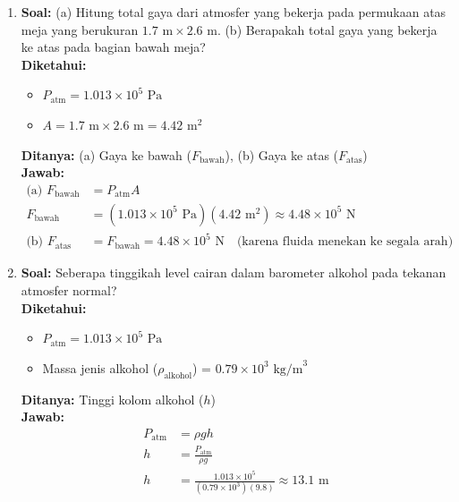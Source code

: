 \documentclass[twocolumn]{article}
\begin{document}
\begin{enumerate}
    \item \textbf{Soal:} (a) Hitung total gaya dari atmosfer yang bekerja pada permukaan atas meja yang berukuran $1.7 \text{ m} \times 2.6 \text{ m}$. (b) Berapakah total gaya yang bekerja ke atas pada bagian bawah meja? \\
    \textbf{Diketahui:}
    \begin{itemize}
        \item $P_{\text{atm}} = 1.013 \times 10^5 \text{ Pa}$
        \item $A = 1.7 \text{ m} \times 2.6 \text{ m} = 4.42 \text{ m}^2$
    \end{itemize}
    \textbf{Ditanya:} (a) Gaya ke bawah ($F_{\text{bawah}}$), (b) Gaya ke atas ($F_{\text{atas}}$) \\
    \textbf{Jawab:}
    \begin{align*}
        \text{(a) } F_{\text{bawah}} &= P_{\text{atm}} A \\
        F_{\text{bawah}} &= (1.013 \times 10^5 \text{ Pa})(4.42 \text{ m}^2) \approx 4.48 \times 10^5 \text{ N} \\
        \text{(b) } F_{\text{atas}} &= F_{\text{bawah}} = 4.48 \times 10^5 \text{ N} \quad \text{(karena fluida menekan ke segala arah)}
    \end{align*}

    \item \textbf{Soal:} Seberapa tinggikah level cairan dalam barometer alkohol pada tekanan atmosfer normal? \\
    \textbf{Diketahui:} 
    \begin{itemize}
        \item $P_{\text{atm}} = 1.013 \times 10^5 \text{ Pa}$
        \item Massa jenis alkohol ($\rho_{\text{alkohol}}$) = $0.79 \times 10^3 \text{ kg/m}^3$
    \end{itemize}
    \textbf{Ditanya:} Tinggi kolom alkohol ($h$) \\
    \textbf{Jawab:}
    \begin{align*}
        P_{\text{atm}} &= \rho g h \\
        h &= \frac{P_{\text{atm}}}{\rho g} \\
        h &= \frac{1.013 \times 10^5}{(0.79 \times 10^3)(9.8)} \approx 13.1 \text{ m}
    \end{align*}


\end{enumerate}
\end{document}
